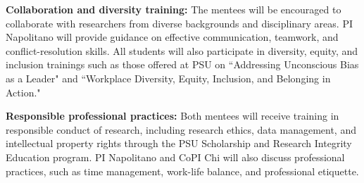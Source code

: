 \documentclass[11pt]{article}
\begin{document}
\noindent \textbf{Collaboration and diversity training: }The mentees will be encouraged to collaborate with researchers from diverse backgrounds and disciplinary areas. 
PI Napolitano will provide guidance on effective communication, teamwork, and conflict-resolution skills. 
All students will also participate in diversity, equity, and inclusion trainings such as those offered at PSU on ``Addressing Unconscious Bias as a Leader" and ``Workplace Diversity, Equity, Inclusion, and Belonging in Action." 

\noindent \textbf{Responsible professional practices:} Both mentees will receive training in responsible conduct of research, including research ethics, data management, and intellectual property rights through the PSU Scholarship and Research Integrity Education program. PI Napolitano and CoPI Chi will also discuss professional practices, such as time management, work-life balance, and professional etiquette.
\end{document}
